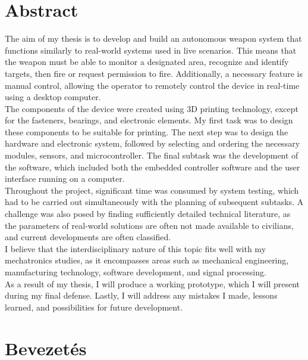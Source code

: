 \documentclass[12pt,a4paper]{article}
\begin{document}
\pagebreak

\section*{Abstract}
The aim of my thesis is to develop and build an autonomous weapon system that functions similarly to real-world systems used in live scenarios. This means that the weapon must be able to monitor a designated area, recognize and identify targets, then fire or request permission to fire. Additionally, a necessary feature is manual control, allowing the operator to remotely control the device in real-time using a desktop computer.\\

The components of the device were created using 3D printing technology, except for the fasteners, bearings, and electronic elements. My first task was to design these components to be suitable for printing. The next step was to design the hardware and electronic system, followed by selecting and ordering the necessary modules, sensors, and microcontroller. The final subtask was the development of the software, which included both the embedded controller software and the user interface running on a computer.\\

Throughout the project, significant time was consumed by system testing, which had to be carried out simultaneously with the planning of subsequent subtasks. A challenge was also posed by finding sufficiently detailed technical literature, as the parameters of real-world solutions are often not made available to civilians, and current developments are often classified.\\

I believe that the interdisciplinary nature of this topic fits well with my mechatronics studies, as it encompasses areas such as mechanical engineering, manufacturing technology, software development, and signal processing.\\

As a result of my thesis, I will produce a working prototype, which I will present during my final defense. Lastly, I will address any mistakes I made, lessons learned, and possibilities for future development.
\pagebreak

\tableofcontents

\pagebreak

\section{Bevezetés}
\end{document}
